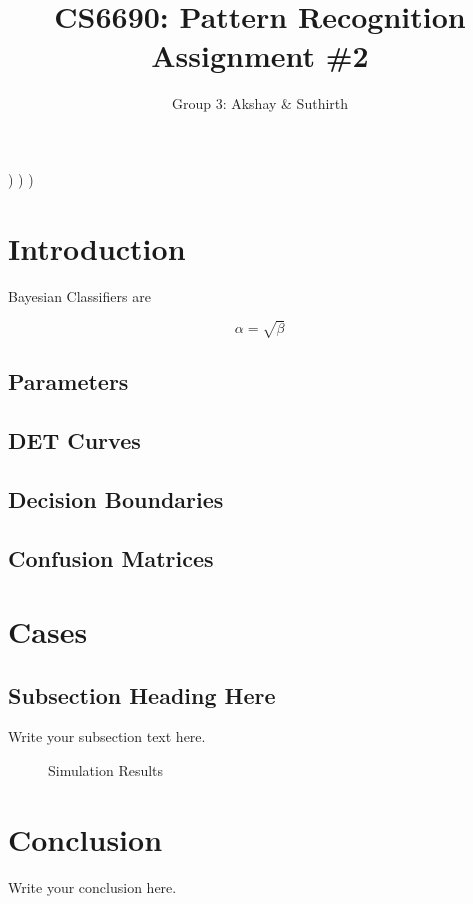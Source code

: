 \documentclass{article}
\begin{document}
\title{CS6690: Pattern Recognition Assignment \#2}
\author{Group 3: Akshay \& Suthirth}
\right) \right) \right) 
\maketitle

\newpage

\section{Introduction}
Bayesian Classifiers are 

\begin{equation}
    \label{simple_equation}
    \alpha = \sqrt{ \beta }
\end{equation}

\subsection{Parameters}
\subsection{DET Curves}
\subsection{Decision Boundaries}
\subsection{Confusion Matrices}

\section{Cases}
\subsection{Subsection Heading Here}
Write your subsection text here.

\begin{figure}
    \centering
    \caption{Simulation Results}
    \label{simulationfigure}
\end{figure}

\section{Conclusion}
Write your conclusion here.
\end{document}
